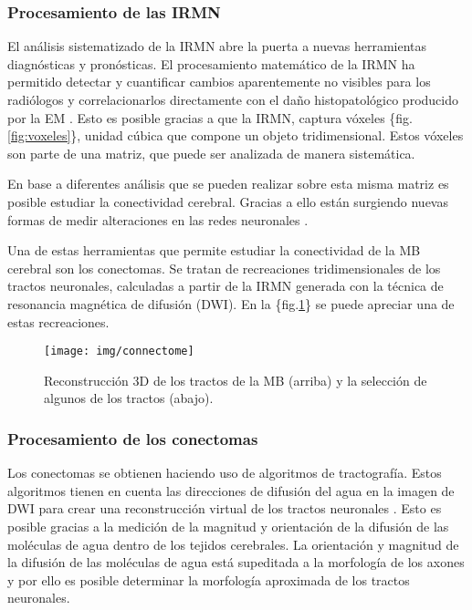\documentclass[fleqn,12pt]{uicarticle} %
\begin{document}
\subsubsection{Procesamiento de las IRMN}

El análisis sistematizado de la IRMN abre la puerta a nuevas herramientas diagnósticas y pronósticas. El procesamiento matemático de la IRMN ha permitido detectar y cuantificar cambios aparentemente no visibles para los radiólogos y correlacionarlos directamente con el daño histopatológico producido por la EM \cite{Beer2016, Nedjati-Gilani2017}. Esto es posible gracias a que la IRMN, captura vóxeles \{fig.\ref{fig:voxeles}\}, unidad cúbica que compone un objeto tridimensional. Estos vóxeles son parte de una matriz, que puede ser analizada de manera sistemática.
 
En base a diferentes análisis que se pueden realizar sobre esta misma matriz es posible estudiar la conectividad cerebral. Gracias a ello están surgiendo nuevas formas de medir alteraciones en las redes neuronales \cite{Johansen2006}.

Una de estas herramientas que permite estudiar la conectividad de la MB cerebral son los conectomas. Se tratan de recreaciones tridimensionales de los tractos neuronales, calculadas a partir de la IRMN generada con la técnica de resonancia magnética de difusión (DWI). En la \{fig.\ref{fig:connectome}\} se puede apreciar una de estas recreaciones.

\begin{figure}[h]
	\centering
	\texttt{[image: img/connectome]}
	\caption{Reconstrucción 3D de los tractos de la MB (arriba) y la selección de algunos de los tractos (abajo).}
	\label{fig:connectome}
\end{figure}


\subsubsection{Procesamiento de los conectomas}

Los conectomas se obtienen haciendo uso de algoritmos de tractografía. Estos algoritmos tienen en cuenta las direcciones de difusión del agua en la imagen de DWI para crear una reconstrucción virtual de los tractos neuronales \cite{Mori2002}. Esto es posible gracias a la medición de la magnitud y orientación de la difusión de las moléculas de agua dentro de los tejidos cerebrales. La orientación y magnitud de la difusión de las moléculas de agua está supeditada a la morfología de los axones \cite{Johansen2006} y por ello es posible determinar la morfología aproximada de los tractos neuronales.
\end{document}
